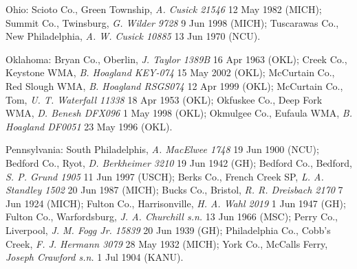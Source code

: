 \documentclass{article}
\begin{document}
Ohio:
Scioto Co., Green Township, \textit{A. Cusick 21546} 12 May 1982 (MICH);
Summit Co., Twinsburg, \textit{G. Wilder 9728} 9 Jun 1998 (MICH);
Tuscarawas Co., New Philadelphia, \textit{A. W. Cusick 10885} 13 Jun 1970 (NCU).

Oklahoma:
Bryan Co., Oberlin, \textit{J. Taylor 1389B} 16 Apr 1963 (OKL);
Creek Co., Keystone WMA, \textit{B. Hoagland KEY-074} 15 May 2002 (OKL);
McCurtain Co., Red Slough WMA, \textit{B. Hoagland RSGS074} 12 Apr 1999 (OKL);
McCurtain Co., Tom, \textit{U. T. Waterfall 11338} 18 Apr 1953 (OKL);
Okfuskee Co., Deep Fork WMA, \textit{D. Benesh DFX096} 1 May 1998 (OKL);
Okmulgee Co., Eufaula WMA, \textit{B. Hoagland DF0051} 23 May 1996 (OKL).

Pennsylvania:
South Philadelphis, \textit{A. MacElwee 1748} 19 Jun 1900 (NCU);
Bedford Co., Ryot, \textit{D. Berkheimer 3210} 19 Jun 1942 (GH);
Bedford Co., Bedford, \textit{S. P. Grund 1905} 11 Jun 1997 (USCH);
Berks Co., French Creek SP, \textit{L. A. Standley 1502} 20 Jun 1987 (MICH);
Bucks Co., Bristol, \textit{R. R. Dreisbach 2170} 7 Jun 1924 (MICH);
Fulton Co., Harrisonville, \textit{H. A. Wahl 2019} 1 Jun 1947 (GH);
Fulton Co., Warfordsburg, \textit{J. A. Churchill s.n.} 13 Jun 1966 (MSC);
Perry Co., Liverpool, \textit{J. M. Fogg Jr. 15839} 20 Jun 1939 (GH);
Philadelphia Co., Cobb's Creek, \textit{F. J. Hermann 3079} 28 May 1932 (MICH);
York Co., McCalls Ferry, \textit{Joseph Crawford s.n.} 1 Jul 1904 (KANU).
\end{document}
